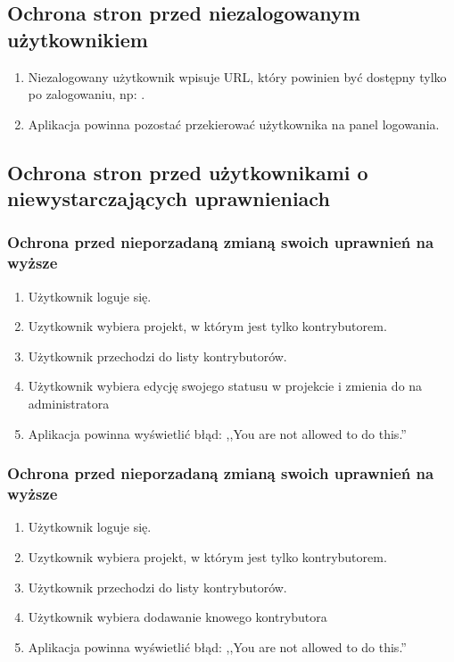 \documentclass[a4paper,12pt,notitlepage]{mwrep}
\begin{document}
\subsection{Ochrona stron przed niezalogowanym użytkownikiem}
\begin{enumerate}
	\item	Niezalogowany użytkownik wpisuje URL, który powinien być dostępny tylko po zalogowaniu,
		np: .
	\item	Aplikacja powinna pozostać przekierować użytkownika na panel logowania.
\end{enumerate}

\subsection{Ochrona stron przed użytkownikami o niewystarczających uprawnieniach}
\subsubsection{Ochrona przed nieporzadaną zmianą swoich uprawnień na wyższe}
\begin{enumerate}
	\item	Użytkownik loguje się.
	\item	Uzytkownik wybiera projekt, w którym jest tylko kontrybutorem.
	\item	Użytkownik przechodzi do listy kontrybutorów.
	\item	Użytkownik wybiera edycję swojego statusu w projekcie i zmienia do na administratora
	\item	Aplikacja powinna wyświetlić błąd: ,,You are not allowed to do this.''
\end{enumerate}

\subsubsection{Ochrona przed nieporzadaną zmianą swoich uprawnień na wyższe}
\begin{enumerate}
	\item	Użytkownik loguje się.
	\item	Uzytkownik wybiera projekt, w którym jest tylko kontrybutorem.
	\item	Użytkownik przechodzi do listy kontrybutorów.
	\item	Użytkownik wybiera dodawanie knowego kontrybutora
	\item	Aplikacja powinna wyświetlić błąd: ,,You are not allowed to do this.''
\end{enumerate}
\end{document}
